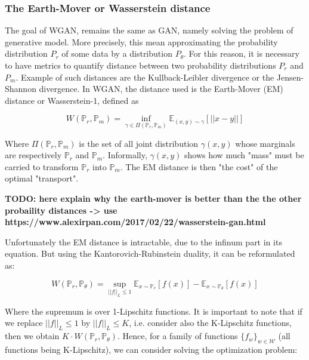 \documentclass{article}
\begin{document}
\subsubsection{The Earth-Mover or Wasserstein distance}


The goal of WGAN, remains the same as GAN, namely solving the problem of generative model. More precisely, this mean approximating the probability distribution $P_r$ of some data by a distribution $P_{\theta}$. For this reason, it is necessary to have metrics to quantify distance between two probability distributions $P_r$ and $P_m$. Example of such distances are the Kullback-Leibler divergence or the Jensen-Shannon divergence. In WGAN, the distance used is the Earth-Mover (EM) distance or Wasserstein-1, defined as 

\begin{equation}
    W(\mathbb{P}_r, \mathbb{P}_m) = \inf_{\gamma \in \Pi(\mathbb{P}_r, \mathbb{P}_m)} \mathbb{E}_{(x,y) \sim \gamma} [||x-y||]
\end{equation}

Where $\Pi(\mathbb{P}_r, \mathbb{P}_m)$ is the set of all joint distribution $\gamma(x,y)$ whose marginals are respectively $\mathbb{P}_r$ and $\mathbb{P}_m$. Informally, $\gamma(x,y)$ shows how much "mass" must be carried to transform $\mathbb{P}_r$ into $\mathbb{P}_m$. The EM distance is then "the cost" of the optimal "transport".

\textbf{TODO: here explain why the earth-mover is better than the the other probaility distances -> use https://www.alexirpan.com/2017/02/22/wasserstein-gan.html}

Unfortunately the EM distance is intractable, due to the infinum part in its equation. But using the Kantorovich-Rubinstein duality, it can be reformulated as:


\begin{equation}
    W(\mathbb{P}_r, \mathbb{P}_{\theta}) = \sup_{||f||_L \leq 1} \mathbb{E}_{x \sim \mathbb{P}_r} [f(x)] - \mathbb{E}_{x \sim \mathbb{P}_{\theta}} [f(x)] 
\end{equation}

Where the supremum is over 1-Lipschitz functions. It is important to note that if we replace $||f||_L \leq 1$ by $||f||_L \leq K$, i.e. consider also the K-Lipschitz functions, then we obtain $K \cdot W(\mathbb{P}_r, \mathbb{P}_{\theta})$. Hence, for a family of functions $\{f_w\}_{w \in \mathcal{W}}$ (all functions being K-Lipschitz), we can consider solving the optimization problem:
\end{document}
